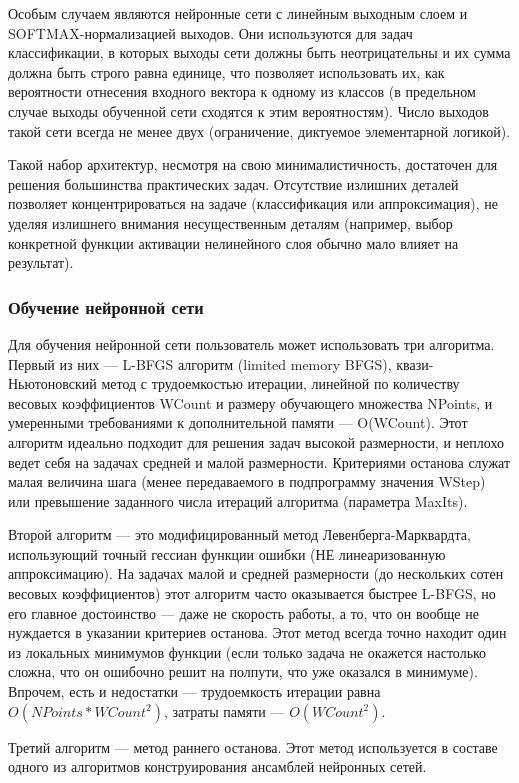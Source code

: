 Особым случаем являются нейронные сети с линейным выходным слоем и
SOFTMAX-нормализацией выходов. Они используются для задач классификации, в
которых выходы сети должны быть неотрицательны и их сумма должна быть строго
равна единице, что позволяет использовать их, как вероятности отнесения входного
вектора к одному из классов (в предельном случае выходы обученной сети сходятся
к этим вероятностям). Число выходов такой сети всегда не менее двух
(ограничение, диктуемое элементарной логикой).

Такой набор архитектур, несмотря на свою минималистичность, достаточен для
решения большинства практических задач. Отсутствие излишних деталей позволяет
концентрироваться на задаче (классификация или аппроксимация), не уделяя
излишнего внимания несущественным деталям (например, выбор конкретной функции
активации нелинейного слоя обычно мало влияет на результат).

\subsubsection{Обучение нейронной сети}

Для обучения нейронной сети пользователь может использовать три алгоритма.
Первый из них — L-BFGS алгоритм (limited memory BFGS), квази-Ньютоновский метод
с трудоемкостью итерации, линейной по количеству весовых коэффициентов WCount и
размеру обучающего множества NPoints, и умеренными требованиями к дополнительной
памяти — O(WCount). Этот алгоритм идеально подходит для решения задач высокой
размерности, и неплохо ведет себя на задачах средней и малой размерности.
Критериями останова служат малая величина шага (менее передаваемого в
подпрограмму значения WStep) или превышение заданного числа итераций алгоритма
(параметра MaxIts).

Второй алгоритм — это модифицированный метод Левенберга-Марквардта, использующий
точный гессиан функции ошибки (НЕ линеаризованную аппроксимацию). На задачах
малой и средней размерности (до нескольких сотен весовых коэффициентов) этот
алгоритм часто оказывается быстрее L-BFGS, но его главное достоинство — даже не
скорость работы, а то, что он вообще не нуждается в указании критериев останова.
Этот метод всегда точно находит один из локальных минимумов функции (если только
задача не окажется настолько сложна, что он ошибочно решит на полпути, что уже
оказался в минимуме). Впрочем, есть и недостатки — трудоемкость итерации равна
$O(NPoints*WCount^2)$, затраты памяти — $O(WCount^2)$.

Третий алгоритм — метод раннего останова. Этот метод используется в составе
одного из алгоритмов конструирования ансамблей нейронных сетей.

